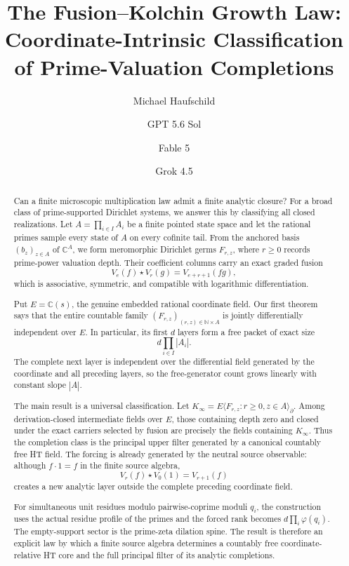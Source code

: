 \documentclass[11pt]{article}
\title{The Fusion--Kolchin Growth Law:\\
Coordinate-Intrinsic Classification of Prime-Valuation Completions}
\author{Michael Haufschild \and GPT 5.6 Sol \and Fable 5 \and Grok 4.5}
\date{}
\theoremstyle{definition}
\theoremstyle{remark}
\newcommand{\C}{\mathbb C}
\newcommand{\N}{\mathbb N}
\newcommand{\diff}{\partial}
\begin{document}
\maketitle

\begin{abstract}
Can a finite microscopic multiplication law admit a finite analytic closure?  For a broad class
of prime-supported Dirichlet systems, we answer this by classifying all closed realizations.  Let
\(A=\prod_{i\in I}A_i\) be a finite pointed state space and let the rational primes sample every
state of \(A\) on every cofinite tail.  From the anchored basis \((b_z)_{z\in A}\) of
\(\C^A\), we form meromorphic Dirichlet germs \(F_{r,z}\), where \(r\geq0\) records prime-power
valuation depth.  Their coefficient columns carry an exact graded fusion
\[
 V_e(f)\star V_r(g)=V_{e+r+1}(fg),
\]
which is associative, symmetric, and compatible with logarithmic differentiation.

Put \(E=\C(s)\), the genuine embedded rational coordinate field.  Our first theorem says that the
entire countable family \((F_{r,z})_{(r,z)\in\N\times A}\) is jointly differentially independent
over \(E\).  In particular, its first \(d\) layers form a free packet of exact size
\[
 d\prod_{i\in I}|A_i|.
\]
The complete next layer is independent over the differential field generated by the coordinate
and all preceding layers, so the free-generator count grows linearly with constant slope
\(|A|\).

The main result is a universal classification.  Let
\(K_\infty=E\langle F_{r,z}:r\geq0,z\in A\rangle_\diff\).  Among derivation-closed intermediate
fields over \(E\), those containing depth zero and closed under the exact carriers selected by
fusion are precisely the fields containing \(K_\infty\).  Thus the completion class is the
principal upper filter generated by a canonical countably free HT field.  The forcing is already
generated by the neutral source observable: although \(f\cdot1=f\) in the finite source algebra,
\[
 V_r(f)\star V_0(1)=V_{r+1}(f)
\]
creates a new analytic layer outside the complete preceding coordinate field.

For simultaneous unit residues modulo pairwise-coprime moduli \(q_i\), the construction uses the
actual residue profile of the primes and the forced rank becomes
\(d\prod_i\varphi(q_i)\).  The empty-support sector is the prime-zeta dilation spine.  The result
is therefore an explicit law by which a finite source algebra determines a countably free
coordinate-relative HT core and the full principal filter of its analytic completions.
\end{abstract}
\end{document}
